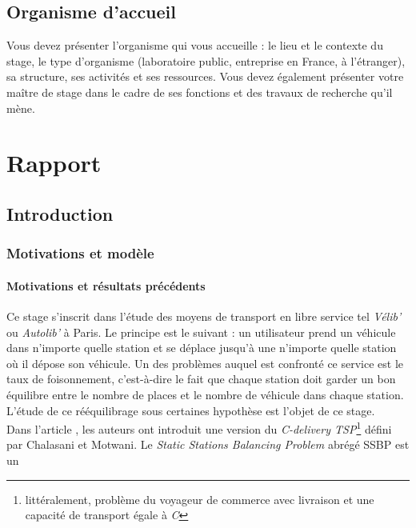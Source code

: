 \documentclass[twoside,10pt,openany,a4paper]{rapport}
\begin{document}
\tableofcontents
{}
\listoffigures
{}

\chapter*{Organisme d'accueil}

Vous devez présenter l’organisme qui vous accueille : le lieu et le contexte du stage, le type d’organisme (laboratoire public, entreprise en France, à l’étranger), sa structure, ses activités et ses ressources. Vous devez également présenter votre maître de stage dans le cadre de ses fonctions et des travaux de recherche qu’il mène.

\part{Rapport}

\chapter{Introduction}

\section{Motivations et modèle}

\subsection{Motivations et résultats précédents}
Ce stage s'inscrit dans l'étude des moyens de transport en libre service tel \emph{Vélib'} ou \emph{Autolib'} à Paris. Le principe est le suivant : un utilisateur prend un véhicule dans n'importe quelle station et se déplace jusqu'à une n'importe quelle station où il dépose son véhicule. Un des problèmes auquel est confronté ce service est le taux de foisonnement, c'est-à-dire le fait que chaque station doit garder un bon équilibre entre le nombre de places et le nombre de véhicule dans chaque station. L'étude de ce rééquilibrage sous certaines hypothèse est l'objet de ce stage.
\\

Dans l'article \cite{Benchimol2011}, les auteurs ont introduit une version du \emph{C-delivery TSP}\footnote{littéralement, problème du voyageur de commerce avec livraison et une capacité de transport égale à \it{C}} défini par Chalasani et Motwani. Le \emph{Static Stations Balancing Problem} abrégé SSBP est un 
\end{document}
